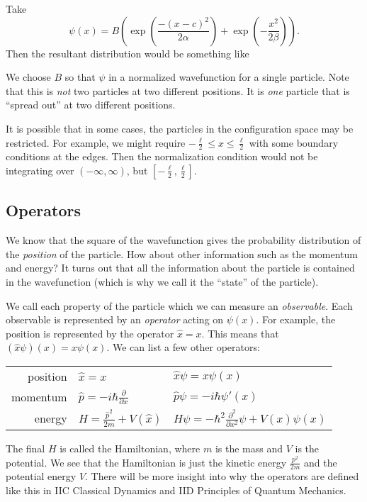 \documentclass[a4paper]{article}
\begin{document}
\begin{eg}
  Take
  \[
    \psi(x) = B\left(\exp\left(\frac{-(x - c)^2}{2\alpha}\right) + \exp\left(-\frac{x^2}{2\beta}\right)\right).
  \]
  Then the resultant distribution would be something like
  \begin{center}
  \end{center}
  We choose $B$ so that $\psi$ in a normalized wavefunction for a single particle. Note that this is \emph{not} two particles at two different positions. It is \emph{one} particle that is ``spread out'' at two different positions.
\end{eg}
It is possible that in some cases, the particles in the configuration space may be restricted. For example, we might require $ -\frac{\ell}{2} \leq x \leq \frac{\ell}{2}$ with some boundary conditions at the edges. Then the normalization condition would not be integrating over $(-\infty, \infty)$, but $[-\frac{\ell}{2}, \frac{\ell}{2}]$.

\subsection{Operators}
We know that the square of the wavefunction gives the probability distribution of the \emph{position} of the particle. How about other information such as the momentum and energy? It turns out that all the information about the particle is contained in the wavefunction (which is why we call it the ``state'' of the particle).

We call each property of the particle which we can measure an \emph{observable}. Each observable is represented by an \emph{operator} acting on $\psi(x)$. For example, the position is represented by the operator $\hat{x} = x$. This means that $(\hat{x} \psi)(x) = x\psi(x)$. We can list a few other operators:
\begin{center}
  \begin{tabular}{rll}
    position & $\hat{x} = x$ & $\hat{x} \psi = x\psi(x)$\\
    momentum & $\hat{p} = -i\hbar \frac{\partial}{\partial x}$ & $\hat{p}\psi = -i\hbar \psi'(x)$\\
    energy & $H = \frac{\hat{p}^2}{2m} + V(\hat{x})$ & $H\psi = -\hbar^2 \frac{\partial^2}{\partial x^2}\psi + V(x)\psi(x)$
  \end{tabular}
\end{center}
The final $H$ is called the Hamiltonian, where $m$ is the mass and $V$ is the potential. We see that the Hamiltonian is just the kinetic energy $\frac{p^2}{2m}$ and the potential energy $V$. There will be more insight into why the operators are defined like this in IIC Classical Dynamics and IID Principles of Quantum Mechanics.
\end{document}

